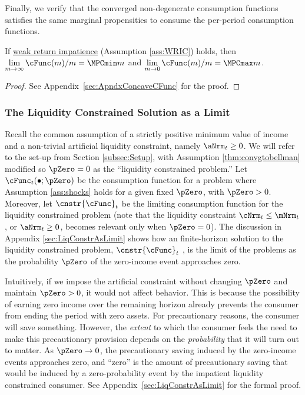 \documentclass[BufferStockTheory]{subfiles}
\begin{document}
Finally, we verify that the converged non-degenerate consumption functions satisfies the same marginal propensities to consume the per-period consumption functions.

\begin{lemma}\label{lemma:MPCBoundsConvg}
If \hyperlink{WRIC}{weak return impatience} (Assumption \ref{ass:WRIC}) holds, then $\lim\limits_{m\rightarrow \infty} \cFunc (m)/m =\MPCmin m$ and $\lim\limits_{m\rightarrow 0} \cFunc (m)/m =\MPCmax m$.

\end{lemma}
\begin{proof}\let\qed\relax
See Appendix~\ref{sec:ApndxConcaveCFunc} for the proof.

\end{proof}


\hypertarget{The-Liquidity-Constrained-Solution-as-a-Limit}{}
\subsubsection{The Liquidity Constrained Solution as a Limit}\label{subsubsec:deatonIsLimit}

Recall the common assumption \citep{deatonLiqConstr,aiyagari:ge, lsIncFluct, mstIncFluct} of a strictly positive minimum value of income and a non-trivial artificial liquidity constraint, namely $\aNrm_{t}\geq 0$.
We will refer to the set-up from Section \ref{subsec:Setup}, with Assumption \ref{thm:convgtobellman} modified so $\pZero=0$ as the ``liquidity constrained problem.'' Let $\cFunc_{t}(\bullet;\pZero)$ be the consumption function for a problem where Assumption \ref{ass:shocks} holds for a given fixed $\pZero$, with $\pZero>0$.
Moreover, let $\cnstr{\cFunc}_{t}$ be the limiting consumption function for the liquidity constrained problem (note that the liquidity constraint $\cNrm_{t}\leq \mNrm_{t}$, or $\aNrm_{t}\geq 0$, becomes relevant only when $\pZero= 0$).
The discussion in Appendix \ref{sec:LiqConstrAsLimit} shows how an finite-horizon solution to the liquidity constrained problem, $\cnstr{\cFunc}_{t}$ , is the limit of the problems as the probability $\pZero$ of the zero-income event approaches zero.


Intuitively, if we impose the artificial constraint without changing $\pZero$ and maintain $\pZero>0$, it would not affect behavior.
This is because the possibility of earning zero income over the remaining horizon already prevents the consumer from ending the period with zero assets.
For precautionary reasons, the consumer will save something.
However, the \textit{extent} to which the consumer feels the need to make this precautionary provision depends on the \textit{probability} that it will turn out to matter.
As  $\pZero \rightarrow 0$, the   precautionary saving induced by the zero-income events approaches zero, and ``zero'' is the amount of precautionary saving that would be induced by a zero-probability event by the impatient liquidity constrained consumer.
See Appendix~\ref{sec:LiqConstrAsLimit} for the formal proof.
\end{document}
